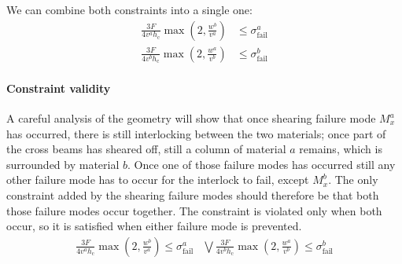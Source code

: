 We can combine both constraints into a single one:
\begin{align*}
	\frac{ 3 F }{ 4 v^a h_\text{c} }  \max{\left( 2, \frac{w^b}{v^a} \right)} &\le \sigma^a_\text{fail}  \\
	\frac{ 3 F }{ 4 v^b h_\text{c} }  \max{\left( 2, \frac{w^a}{v^b} \right)} &\le \sigma^b_\text{fail}  
\end{align*}


\paragraph{Constraint validity}
A careful analysis of the geometry will show that once shearing failure mode $M_x^a$ has occurred, 
there is still interlocking between the two materials;
once part of the cross beams has sheared off, still a column of material $a$ remains, which is surrounded by material $b$.
Once one of those failure modes has occurred still any other failure mode has to occur for the interlock to fail, except $M_x^b$.
The only constraint added by the shearing failure modes should therefore be that both those failure modes occur together.
The constraint is violated only when both occur, so it is satisfied when either failure mode is prevented.
\begin{align*}
	\frac{ 3 F }{ 4 v^a h_\text{c} }  \max{\left( 2, \frac{w^b}{v^a} \right)} \le \sigma^a_\text{fail}  &\bigvee
	\frac{ 3 F }{ 4 v^b h_\text{c} }  \max{\left( 2, \frac{w^a}{v^b} \right)} \le \sigma^b_\text{fail}  
\end{align*}

